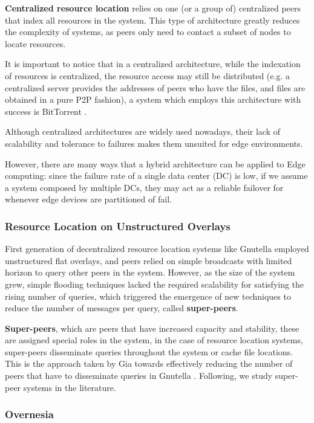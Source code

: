 \textbf{Centralized resource location} relies on one (or a group of) centralized peers that index all resources in the system. This type of architecture greatly reduces the complexity of systems, as peers only need to contact a subset of nodes to locate resources. 

It is important to notice that in a centralized architecture, while the indexation of resources is centralized, the resource access may still be distributed (e.g. a centralized server provides the addresses of peers who have the files, and files are obtained in a pure P2P fashion), a system which employs this architecture with success is BitTorrent \cite{cohen2003incentives}.

Although centralized architectures are widely used nowadays, their lack of scalability and tolerance to failures makes them unsuited for edge environments.

However, there are many ways that a hybrid architecture can be applied to Edge computing: since the failure rate of a single data center (DC) is low, if we assume a system composed by multiple DCs, they may act as a reliable failover for whenever edge devices are partitioned of fail. 

\subsubsection{Resource Location on Unstructured Overlays}

First generation of decentralized resource location systems like Gnutella \cite{gnutella_gtk} employed unstructured flat overlays, and peers relied on simple broadcasts with limited horizon to query other peers in the system. However, as the size of the system grew, simple flooding techniques lacked the required scalability for satisfying the rising number of queries, which triggered the emergence of new techniques to reduce the number of messages per query, called \textbf{super-peers}. 

\textbf{Super-peers}, which are peers that have increased capacity and stability, these are assigned special roles in the system, in the case of resource location systems, super-peers disseminate queries throughout the system or cache file locations. This is the approach taken by Gia \cite{Chawathe2003} towards effectively reducing the number of peers that have to disseminate queries in Gnutella \cite{gnutella_gtk}. Following, we study super-peer systems in the literature.

\subsubsection*{Overnesia}

